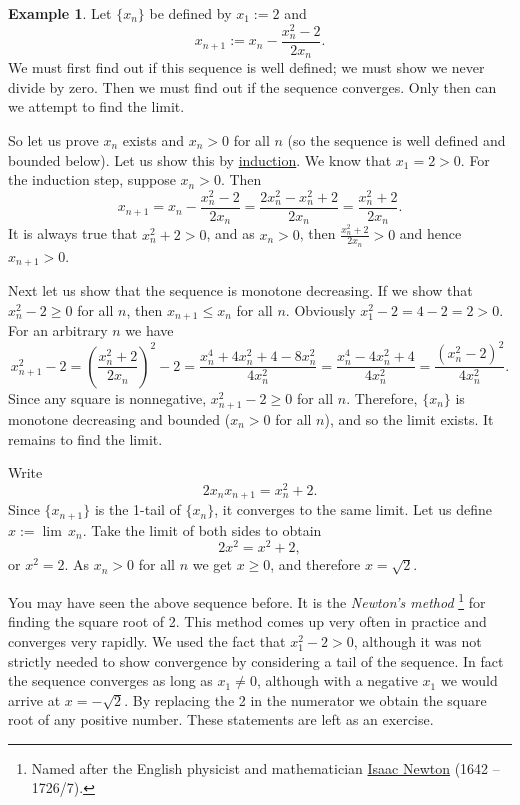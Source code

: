 \documentclass[12pt]{book}
\theoremstyle{plain}
\theoremstyle{remark}
\theoremstyle{definition}
\theoremstyle{exercise}
\theoremstyle{example}
\newtheorem{example}[thm]{Example}
\begin{document}
\begin{example}
Let $\{ x_n \}$ be defined by $x_1 := 2$ and
\begin{equation*}
x_{n+1} := x_n - \frac{x_n^2-2}{2x_n} .
\end{equation*}
We must first find out if this sequence is well defined; we must show we never
divide by zero.
Then we must find out if the sequence converges.  Only then
can we attempt to find the limit.

So let us prove 
$x_n$ exists and $x_n > 0$ for all $n$ (so the sequence is well defined
and bounded below).
Let us show this by \hyperref[induction:thm]{induction}.  We know that
$x_1 = 2 > 0$.  For the induction step, suppose $x_n > 0$.  Then
\begin{equation*}
x_{n+1} = x_n - \frac{x_n^2-2}{2x_n} =
\frac{2x_n^2 - x_n^2+2}{2x_n} =
\frac{x_n^2+2}{2x_n} .
\end{equation*}
It is always true that $x_n^2+2 > 0$,
and as
$x_n > 0$, then $\frac{x_n^2+2}{2x_n} > 0$ and hence $x_{n+1} > 0$.

Next let us
show that the sequence is monotone decreasing.  If we show that
$x_n^2-2 \geq 0$ for all $n$, then $x_{n+1} \leq x_n$ for all $n$.
Obviously $x_1^2-2 = 4-2 = 2 > 0$.  For an arbitrary $n$ we have 
\begin{equation*}
x_{n+1}^2-2 =
{\left( \frac{x_n^2+2}{2x_n} \right)}^2 - 2
=
\frac{x_n^4+4x_n^2+4 - 8x_n^2}{4x_n^2}
=
\frac{x_n^4-4x_n^2+4}{4x_n^2}
=
\frac{{\left( x_n^2-2 \right)}^2}{4x_n^2} .
\end{equation*}
Since any square is nonnegative,
$x_{n+1}^2-2 \geq 0$ for all $n$.  Therefore,
$\{ x_n \}$ is monotone decreasing and bounded ($x_n > 0$ for all $n$), and 
so the limit exists.  It remains to find the limit.

Write
\begin{equation*}
2x_nx_{n+1} = x_n^2+2 .
\end{equation*}
Since $\{ x_{n+1} \}$ is the 1-tail of $\{ x_n \}$, it converges to the
same limit.  Let us define $x := \lim\, x_n$.  Take the limit of
both sides to obtain
\begin{equation*}
2x^2 = x^2+2 ,
\end{equation*}
or $x^2 = 2$.  As $x_n > 0$ for all $n$ we get $x \geq 0$, and therefore $x = \sqrt{2}$.
\end{example}

You may have seen the above sequence before.  It is the
\emph{Newton's method}%
\footnote{%
Named after the English physicist and mathematician
\href{http://en.wikipedia.org/wiki/Isaac_Newton}{Isaac Newton} (1642 --
1726/7).}
for finding the square root of 2.  This method comes up very often in
practice and converges very rapidly.  We used the fact that
$x_1^2 -2 >0$, although it was not strictly needed to show convergence by
considering a tail of the sequence.
In fact the sequence converges as long as $x_1 \not= 0$, although with a negative $x_1$
we would arrive at $x=-\sqrt{2}$.  By replacing the 2 in the numerator we 
obtain the square root of any positive number.  These statements are left as
an exercise.
\end{document}
